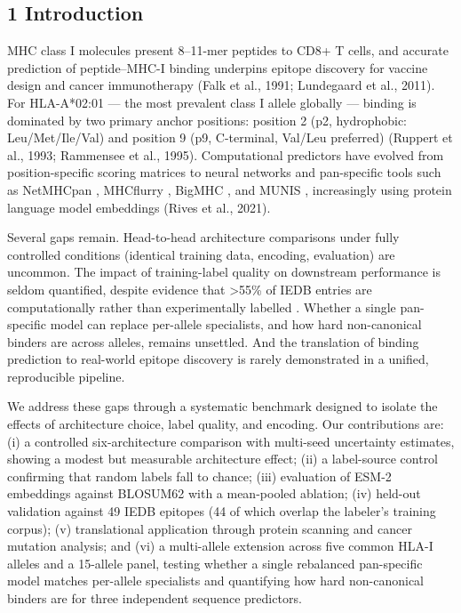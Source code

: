 \documentclass[10pt]{article}
\begin{document}
\subsection{1 Introduction}\label{introduction}

MHC class I molecules present 8--11-mer peptides to CD8+ T cells, and
accurate prediction of peptide--MHC-I binding underpins epitope
discovery for vaccine design and cancer immunotherapy (Falk et al.,
1991; Lundegaard et al., 2011). For HLA-A*02:01 --- the most prevalent
class I allele globally --- binding is dominated by two primary anchor
positions: position 2 (p2, hydrophobic: Leu/Met/Ile/Val) and position 9
(p9, C-terminal, Val/Leu preferred) (Ruppert et al., 1993; Rammensee et
al., 1995). Computational predictors have evolved from position-specific
scoring matrices to neural networks and pan-specific tools such as
NetMHCpan \cite{Reynisson20}, MHCflurry \cite{ODonnell20},
BigMHC \cite{Albert23}, and MUNIS \cite{Wohlwend25},
increasingly using protein language model embeddings (Rives et al.,
2021).

Several gaps remain. Head-to-head architecture comparisons under fully
controlled conditions (identical training data, encoding, evaluation)
are uncommon. The impact of training-label quality on downstream
performance is seldom quantified, despite evidence that \textgreater55\%
of IEDB entries are computationally rather than experimentally labelled
\cite{Preibisch26}. Whether a single pan-specific model can replace per-allele specialists, and how hard non-canonical binders are across alleles, remains unsettled. And the translation of binding prediction to
real-world epitope discovery is rarely demonstrated in a unified,
reproducible pipeline.

We address these gaps through a systematic benchmark designed to isolate
the effects of architecture choice, label quality, and encoding. Our
contributions are: (i) a controlled six-architecture comparison with
multi-seed uncertainty estimates, showing a modest but measurable
architecture effect; (ii) a label-source control confirming that random
labels fall to chance; (iii) evaluation of ESM-2 embeddings against
BLOSUM62 with a mean-pooled ablation; (iv) held-out validation against
49 IEDB epitopes (44 of which overlap the labeler's training corpus);
(v) translational application through protein scanning and cancer
mutation analysis; and (vi) a multi-allele extension across five common
HLA-I alleles and a 15-allele panel, testing whether a single rebalanced
pan-specific model matches per-allele specialists and quantifying how
hard non-canonical binders are for three independent sequence
predictors.
\end{document}
